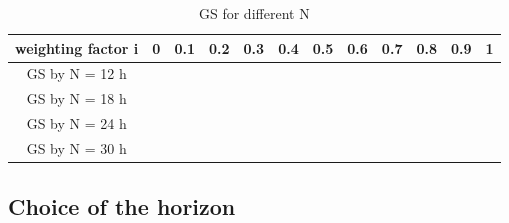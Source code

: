     \begin{table}[h]
    \centering
    \begin{tabular}{c|c|c|c|c|c|c|c|c|c|c|c}
         weighting factor i&0&0.1&0.2&0.3&0.4&0.5&0.6&0.7&0.8&0.9&1  \\
         \hline
         GS by N = 12 h&\\
         GS by N = 18 h&\\
         GS by N = 24 h&\\
         GS by N = 30 h&\\
    \end{tabular}
    \caption{GS for different N}
    \label{tab:GS for different N}
\end{table}
    

     
    
\subsection{Choice of the horizon}
\label{subsec:ChoiceHorizon}